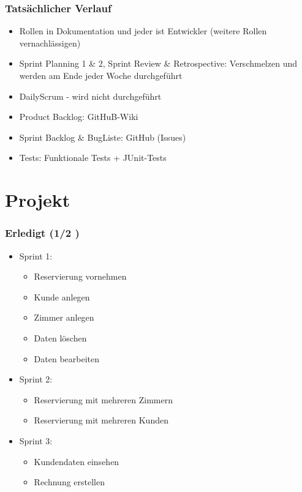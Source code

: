 \documentclass{beamer}
\begin{document}
\begin{frame}
\frametitle{Tats\"achlicher Verlauf} 
\begin{itemize}
\item Rollen in Dokumentation und jeder ist Entwickler (weitere Rollen vernachl\"assigen)
\item Sprint Planning 1 \& 2, Sprint Review \& Retrospective: Verschmelzen und werden am Ende jeder Woche durchgef\"uhrt
\item DailyScrum - wird nicht durchgef\"uhrt
\item Product Backlog: GitHuB-Wiki
\item Sprint Backlog \& BugListe: GitHub (Issues)
\item Tests: Funktionale Tests + JUnit-Tests
\end{itemize}
\end{frame}

\section{Projekt} 

\begin{frame}
\frametitle{Erledigt (1/2 )} 
\begin{itemize}
\item  Sprint 1:
\begin{itemize}
\item  Reservierung vornehmen
\item  Kunde anlegen
\item  Zimmer anlegen
\item  Daten l\"oschen
\item  Daten bearbeiten
\end{itemize}
\item  Sprint 2:
\begin{itemize}
\item  Reservierung mit mehreren Zimmern
\item  Reservierung mit mehreren Kunden
\end{itemize}
\item  Sprint 3:
\begin{itemize}
\item  Kundendaten einsehen
\item  Rechnung erstellen
\end{itemize}
\end{itemize}
\end{frame}
\end{document}
